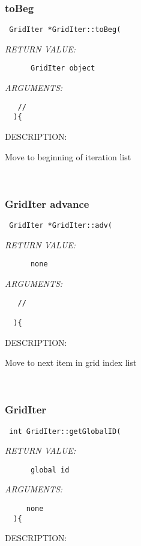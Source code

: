 \subsubsection [toBeg] {toBeg}


  
\begin{verbatim} GridIter *GridIter::toBeg(\end{verbatim}{\em RETURN VALUE:}
\begin{verbatim}      GridIter object\end{verbatim}{\em ARGUMENTS:}
\begin{verbatim}   //  
  ){\end{verbatim}
{\sf DESCRIPTION:\\ }


   Move to beginning of iteration list
   
 
\mbox{}\hrulefill\
 
\subsubsection [GridIter] {GridIter advance}


  
\begin{verbatim} GridIter *GridIter::adv(\end{verbatim}{\em RETURN VALUE:}
\begin{verbatim}      none\end{verbatim}{\em ARGUMENTS:}
\begin{verbatim}   //  
 
  ){\end{verbatim}
{\sf DESCRIPTION:\\ }


   Move to next item in grid index list
   
 
\mbox{}\hrulefill\
 
\subsubsection [GridIter] {GridIter }


  
\begin{verbatim} int GridIter::getGlobalID(\end{verbatim}{\em RETURN VALUE:}
\begin{verbatim}      global id\end{verbatim}{\em ARGUMENTS:}
\begin{verbatim}     none  
  ){\end{verbatim}
{\sf DESCRIPTION:\\ }


